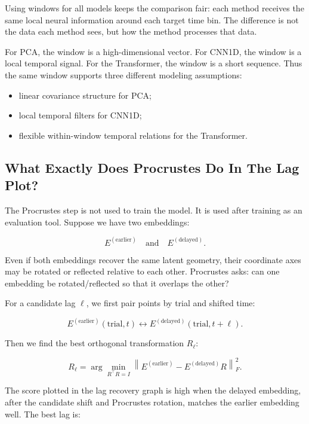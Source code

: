 \documentclass[11pt]{article}
\begin{document}
Using windows for all models keeps the comparison fair: each method receives
the same local neural information around each target time bin. The difference
is not the data each method sees, but how the method processes that data.

For PCA, the window is a high-dimensional vector. For CNN1D, the window is a
local temporal signal. For the Transformer, the window is a short sequence.
Thus the same window supports three different modeling assumptions:

\begin{itemize}
    \item linear covariance structure for PCA;
    \item local temporal filters for CNN1D;
    \item flexible within-window temporal relations for the Transformer.
\end{itemize}

\subsection{What Exactly Does Procrustes Do In The Lag Plot?}

The Procrustes step is not used to train the model. It is used after training
as an evaluation tool. Suppose we have two embeddings:

\begin{equation}
E^{(\text{earlier})}
\quad \text{and} \quad
E^{(\text{delayed})}.
\end{equation}

Even if both embeddings recover the same latent geometry, their coordinate
axes may be rotated or reflected relative to each other. Procrustes asks:
can one embedding be rotated/reflected so that it overlaps the other?

For a candidate lag $\ell$, we first pair points by trial and shifted time:

\begin{equation}
E^{(\text{earlier})}(\text{trial},t)
\leftrightarrow
E^{(\text{delayed})}(\text{trial},t+\ell).
\end{equation}

Then we find the best orthogonal transformation $R_\ell$:

\begin{equation}
R_\ell
=
\arg\min_{R^\top R=I}
\left\|
E^{(\text{earlier})}
-
E^{(\text{delayed})}R
\right\|_F^2.
\end{equation}

The score plotted in the lag recovery graph is high when the delayed embedding,
after the candidate shift and Procrustes rotation, matches the earlier
embedding well. The best lag is:
\end{document}
